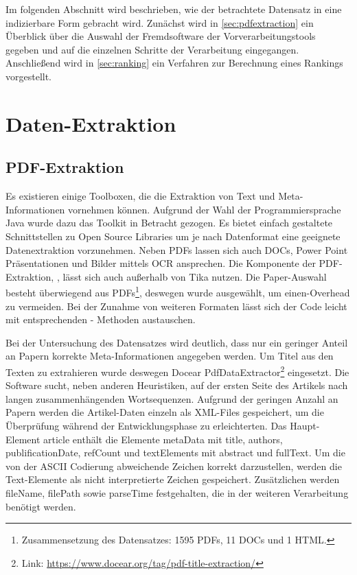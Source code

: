 


Im folgenden Abschnitt wird beschrieben, wie der betrachtete Datensatz in eine indizierbare Form
gebracht wird. Zunächst wird in \autoref{sec:pdfextraction} ein
Überblick über die Auswahl der Fremdsoftware der Vorverarbeitungstools
gegeben und auf die einzelnen Schritte der Verarbeitung eingegangen. Anschließend wird
in \autoref{sec:ranking} ein Verfahren zur Berechnung eines Rankings vorgestellt.



\section{Daten-Extraktion}\label{sec:pdfextraction}


\subsection{PDF-Extraktion}\label{sec:preprosselection}

Es existieren einige Toolboxen, die die Extraktion von Text und
Meta-Informationen vornehmen können.  Aufgrund der Wahl der
Programmiersprache Java wurde dazu das \tika Toolkit in Betracht
gezogen. Es bietet einfach gestaltete Schnittstellen zu Open Source
Libraries um je nach Datenformat eine geeignete Datenextraktion
vorzunehmen. Neben PDFs lassen sich auch DOCs, Power Point
Präsentationen und Bilder mittels OCR ansprechen. Die Komponente der
PDF-Extraktion, \pdfbox, lässt sich auch außerhalb von Tika nutzen.
Die Paper-Auswahl besteht überwiegend aus PDFs\footnote{Zusammensetzung des Datensatzes: 1595 PDFs, 11
DOCs und 1 HTML.}, deswegen wurde \pdfbox ausgewählt, um einen-Overhead
zu vermeiden. Bei der Zunahme von weiteren Formaten lässt sich der
Code leicht mit entsprechenden \tika - Methoden austauschen.

Bei der Untersuchung des Datensatzes wird deutlich, dass nur ein
geringer Anteil an Papern korrekte Meta-Informationen angegeben werden. Um
Titel aus den Texten zu extrahieren wurde deswegen Docear
PdfDataExtractor\footnote{Link:
  \url{https://www.docear.org/tag/pdf-title-extraction/}}
eingesetzt. Die Software sucht, neben anderen Heuristiken, auf der
ersten Seite des Artikels nach langen zusammenhängenden Wortsequenzen.
Aufgrund der geringen Anzahl an Papern werden die Artikel-Daten
einzeln als XML-Files gespeichert, um die Überprüfung während der
Entwicklungsphase zu erleichterten. Das Haupt-Element article enthält
die Elemente metaData mit title, authors, publificationDate, refCount
und textElements mit abstract und fullText.  Um die von der ASCII
Codierung abweichende Zeichen korrekt darzustellen, werden die
Text-Elemente als nicht interpretierte Zeichen gespeichert.
Zusätzlichen werden fileName, filePath sowie parseTime festgehalten,
die in der weiteren Verarbeitung benötigt werden.

